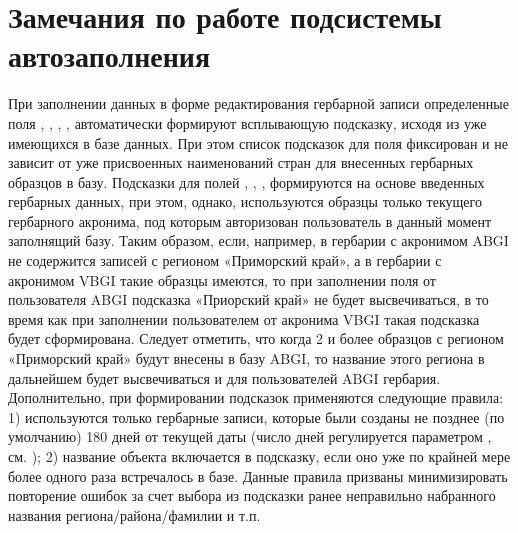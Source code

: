 \documentclass[letterpaper,10pt,russian]{sphinxmanual}
\begin{document}
\section{Замечания по работе подсистемы автозаполнения}
\label{\detokenize{main:id62}}
При заполнении данных в форме редактирования гербарной записи определенные поля
{\hyperref[\detokenize{main:id23}]{}}, {\hyperref[\detokenize{main:id24}]{}}, {\hyperref[\detokenize{main:id25}]{}}, {\hyperref[\detokenize{main:id29}]{}}, {\hyperref[\detokenize{main:id31}]{}} автоматически формируют
всплывающую подсказку, исходя из уже имеющихся в базе данных.
При этом список подсказок для поля {\hyperref[\detokenize{main:id23}]{}} фиксирован и не зависит от уже
присвоенных наименований стран для внесенных гербарных образцов в базу. Подсказки для
полей {\hyperref[\detokenize{main:id24}]{}}, {\hyperref[\detokenize{main:id25}]{}}, {\hyperref[\detokenize{main:id29}]{}}, {\hyperref[\detokenize{main:id31}]{}} формируются на основе введенных
гербарных данных, при этом, однако, используются образцы только
текущего гербарного акронима, под которым авторизован пользователь в данный момент
заполнящий базу. Таким образом, если, например, в гербарии с акронимом ABGI не содержится
записей с регионом «Приморский край», а в гербарии с акронимом VBGI такие образцы имеются,
то при заполнении поля {\hyperref[\detokenize{main:id24}]{}} от пользователя ABGI подсказка «Приорский край» не будет высвечиваться,
в то время как при заполнении пользователем от акронима VBGI такая подсказка будет сформирована.
Следует отметить, что когда 2 и более образцов с регионом «Приморский край» будут
внесены в базу ABGI, то название этого региона в дальнейшем будет высвечиваться и
для пользователей ABGI гербария.
Дополнительно, при формировании подсказок применяются следующие правила: 1) используются только
гербарные записи, которые были созданы не позднее (по умолчанию) 180 дней от текущей даты (число дней регулируется
параметром , см. );
2) название объекта включается в подсказку, если оно уже по крайней мере более одного раза встречалось в базе.
Данные правила призваны минимизировать повторение ошибок за счет выбора из подсказки
ранее неправильно набранного названия региона/района/фамилии и т.п.
\end{document}

